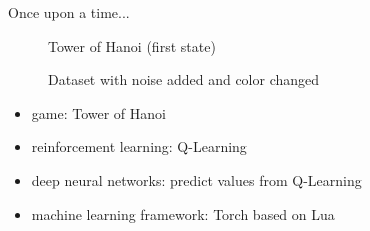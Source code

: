 \documentclass{beamer}
\begin{document}
\begin{frame}{Once upon a time...}
	\begin{minipage}{0.5\textwidth}
		\begin{figure}[H]
			\caption*{Tower of Hanoi (first state)}
		\end{figure}
		\vspace*{-1.45cm}
		\begin{figure}[H]
			\centering
			\captionsetup{justification=centering}
			\caption*{Dataset with noise added and color changed}
		\end{figure}
	\end{minipage} \hfill
	\begin{minipage}{0.45\textwidth}
		\begin{itemize}
			\item game: Tower of Hanoi
			\item reinforcement learning: Q-Learning
			\item deep neural networks: predict values from Q-Learning
			\item machine learning framework: Torch based on Lua
		\end{itemize}
	\end{minipage}
\end{frame}
\end{document}

